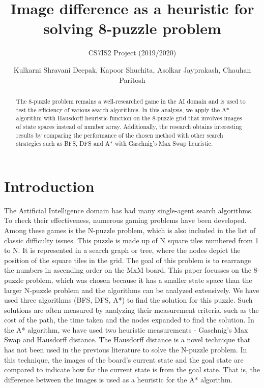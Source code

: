 \documentclass{svproc}
\begin{document}
\mainmatter
\title{Image difference as a heuristic for solving 8-puzzle problem}
\subtitle{CS7IS2 Project (2019/2020)}
\author{Kulkarni Shravani Deepak, Kapoor Shuchita, Asolkar Jayprakash, Chauhan Paritosh}



\maketitle

\vspace{0cm}
\begin{abstract}
The 8-puzzle problem remains a well-researched game in the AI domain and is used to test the efficiency of various search algorithms. In this analysis, we apply the A* algorithm with Hausdorff heuristic function on the 8-puzzle grid that involves images of state spaces instead of number array. Additionally, the research obtains interesting results by comparing the performance of the chosen method with other search strategies such as BFS, DFS and A* with Gaschnig’s Max Swap heuristic.  
\end{abstract}
%

 

\section{Introduction}
\noindent The Artificial Intelligence domain has had many single-agent search algorithms. To check their effectiveness, numerous gaming problems have been developed. Among these games is the N-puzzle problem, which is also included in the list of classic difficulty issues. This puzzle is made up of N square tiles numbered from 1 to N. It is represented in a search graph or tree, where the nodes depict the position of the square tiles in the grid. The goal of this problem is to rearrange the numbers in ascending order on the MxM board. This paper focusses on the 8-puzzle problem, which was chosen because it has a smaller state space than the larger N-puzzle problem and the algorithms can be analyzed extensively. We have used three algorithms (BFS, DFS, A*) to find the solution for this puzzle. Such solutions are often measured by analyzing their measurement criteria, such as the cost of the path, the time taken and the nodes expanded to find the solution. In the A* algorithm, we have used two heuristic measurements - Gaschnig’s Max Swap and Hausdorff distance. The Hausdorff distance is a novel technique that has not been used in the previous literature to solve the N-puzzle problem. In this technique, the images of the board's current state and the goal state are compared to indicate how far the current state is from the goal state. That is, the difference between the images is used as a heuristic for the A* algorithm. \\
\end{document}
